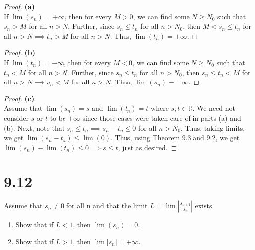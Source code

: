 \documentclass[10pt,a4paper]{article}
\theoremstyle{definition}
\begin{document}
\begin{proof}{\textbf{(a)}}
\\If $\lim(s_n) = +\infty$, then for every $M > 0$, we can find some $N \geq N_0$ such that $s_n > M$ for all $n > N$. Further, since $s_n \leq t_n$ for all $n > N_0$, then $M < s_n \leq t_n$ for all $n > N \implies t_n > M$ for all $n > N$. Thus, $\lim(t_n) = +\infty$. 
\end{proof}

\begin{proof}{\textbf{(b)}}
\\If $\lim(t_n) = -\infty$, then for every $M < 0$, we can find some $N \geq N_0$ such that $t_n < M$ for all $n > N$. Further, since $s_n \leq t_n$ for all $n > N_0$, then $s_n \leq t_n < M$ for all $n > N \implies s_n < M$ for all $n > N$. Thus, $\lim(s_n) = -\infty$. 
\end{proof}

\begin{proof}{\textbf{(c)}}
\\Assume that $\lim(s_n) = s$ and $\lim(t_n) = t$ where $s, t \in \mathbb{R}$. We need not consider $s$ or $t$ to be $\pm\infty$ since those cases were taken care of in parts (a) and (b). Next, note that $s_n \leq t_n \implies s_n - t_n \leq 0$ for all $n > N_0$. Thus, taking limits, we get $\lim(s_n - t_n) \leq \lim(0)$. Thus, using Theorem 9.3 and 9.2, we get $\lim(s_n) - \lim(t_n) \leq 0 \implies s \leq t$, just as desired. 
\end{proof}


\section*{9.12}
Assume that $s_n \neq 0$ for all n and that the limit $\displaystyle L = \lim \left|\frac{s_{n + 1}}{s_n}\right|$ exists.
\begin{enumerate}[label = (\alph*)]
\item Show that if $L < 1$, then $\lim(s_n) = 0$.
\item Show that if $L > 1$, then $\lim|s_n| = +\infty$.
\end{enumerate}
\end{document}

